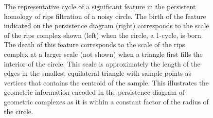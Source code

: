 \begin{figure}[htbp]
    \caption{The representative cycle of a significant feature in the persistent homology of rips filtration of a noisy circle.
            The birth of the feature indicated on the persistence diagram (right) corresponds to the scale of the rips complex shown (left) when the circle, a 1-cycle, is born.
            The death of this feature corresponds to the scale of the rips complex at a larger scale (not shown) when a triangle first fills the interior of the circle.
            This scale is approximately the length of the edges in the smallest equilateral triangle with sample points as vertices that contains the centroid of the sample.
            This illustrates the geometric information encoded in the persistence diagram of geometric complexes as it is within a constant factor of the radius of the circle.}
    \label{fig:cycle_diagrams}
\end{figure}

